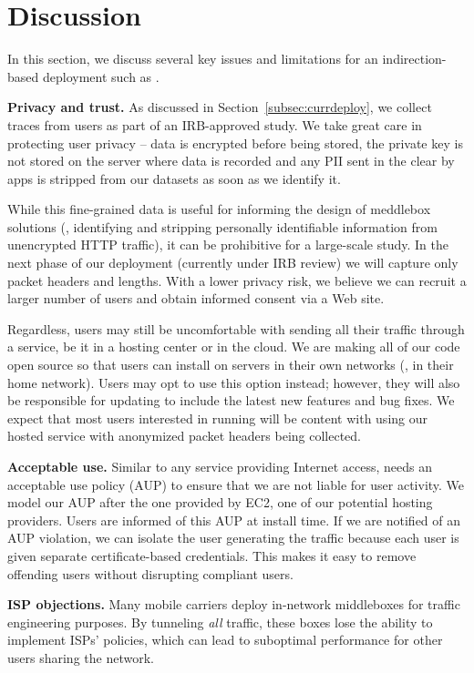 \section{Discussion}
\label{sec:discussion}
In this section, we discuss several key issues and limitations for an indirection-based 
deployment such as \meddle.
 
\noindent\textbf{Privacy and trust.} As discussed in Section~\ref{subsec:currdeploy}, we 
collect traces from users as part of an IRB-approved study. We take great care in 
protecting user privacy -- data is encrypted before being stored, the private key is 
not stored on the server where data is recorded and any PII sent in the 
clear by apps is stripped from our datasets as soon as we identify it. 

While this fine-grained data is useful for informing the design of meddlebox solutions (\eg, 
identifying and stripping personally identifiable information from unencrypted 
HTTP traffic), it can be prohibitive for a large-scale study. In the next phase of 
our deployment (currently under IRB review) we will capture only packet headers 
and lengths. With a lower privacy risk, we believe we can recruit a larger number 
of users and obtain informed consent via a Web site. 

Regardless, users may still be uncomfortable with sending all their traffic through a 
\meddle service, be it in a hosting center or in the cloud. We are making all of 
our code open source so that users can install \meddle on servers in their 
own networks (\eg, in their home network). Users may opt to use this option instead; however, they will also be responsible 
for updating \meddle to include the latest new features and bug fixes. We expect 
that most users interested in running \meddle will be content with using our hosted 
\meddle service with anonymized packet headers being collected. 

\noindent\textbf{Acceptable use.} Similar to any service providing Internet access, 
\meddle needs an acceptable use policy (AUP) to ensure that we are not liable for 
user activity. We model our AUP after the one provided by EC2, one of our potential 
hosting providers. Users are informed of this AUP at install time. If we are notified 
of an AUP violation, we can isolate the user generating the traffic because each 
user is given separate certificate-based credentials. This makes it easy to 
remove offending users without disrupting compliant users.

\noindent\textbf{ISP objections.} Many mobile carriers deploy in-network middleboxes 
for traffic engineering purposes. By tunneling \emph{all} traffic, these boxes lose the 
ability to implement ISPs' policies, which can lead to suboptimal performance for 
other users sharing the network. 

